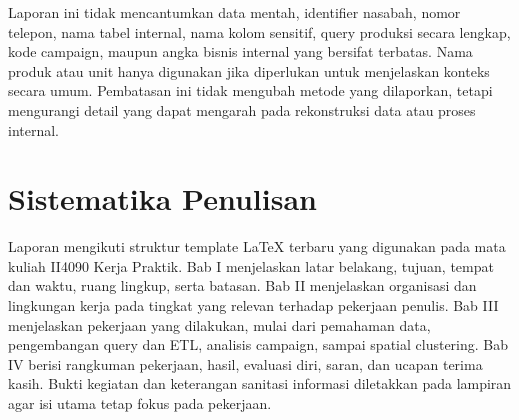 Laporan ini tidak mencantumkan data mentah, identifier nasabah, nomor telepon, nama tabel internal, nama kolom sensitif, query produksi secara lengkap, kode campaign, maupun angka bisnis internal yang bersifat terbatas. Nama produk atau unit hanya digunakan jika diperlukan untuk menjelaskan konteks secara umum. Pembatasan ini tidak mengubah metode yang dilaporkan, tetapi mengurangi detail yang dapat mengarah pada rekonstruksi data atau proses internal.

\section{Sistematika Penulisan}
Laporan mengikuti struktur template LaTeX terbaru yang digunakan pada mata kuliah II4090 Kerja Praktik. Bab I menjelaskan latar belakang, tujuan, tempat dan waktu, ruang lingkup, serta batasan. Bab II menjelaskan organisasi dan lingkungan kerja pada tingkat yang relevan terhadap pekerjaan penulis. Bab III menjelaskan pekerjaan yang dilakukan, mulai dari pemahaman data, pengembangan query dan ETL, analisis campaign, sampai spatial clustering. Bab IV berisi rangkuman pekerjaan, hasil, evaluasi diri, saran, dan ucapan terima kasih. Bukti kegiatan dan keterangan sanitasi informasi diletakkan pada lampiran agar isi utama tetap fokus pada pekerjaan.
